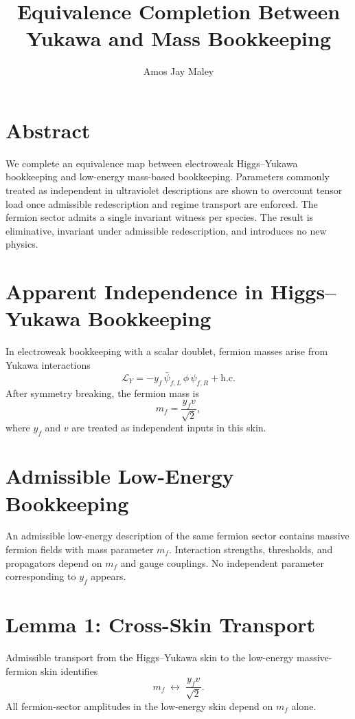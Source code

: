 ﻿\documentclass[11pt]{article}
\title{Equivalence Completion Between Yukawa and Mass Bookkeeping}
\author{Amos Jay Maley}
\date{}
\begin{document}
\maketitle

\section*{Abstract}
We complete an equivalence map between electroweak Higgs--Yukawa bookkeeping and low-energy mass-based bookkeeping. Parameters commonly treated as independent in ultraviolet descriptions are shown to overcount tensor load once admissible redescription and regime transport are enforced. The fermion sector admits a single invariant witness per species. The result is eliminative, invariant under admissible redescription, and introduces no new physics.

\section{Apparent Independence in Higgs--Yukawa Bookkeeping}
In electroweak bookkeeping with a scalar doublet, fermion masses arise from Yukawa interactions
\begin{equation}
\mathcal{L}_Y = -y_f\,\bar{\psi}_{f,L}\,\phi\,\psi_{f,R} + \text{h.c.}
\end{equation}
After symmetry breaking, the fermion mass is
\begin{equation}
m_f = \frac{y_f v}{\sqrt{2}} ,
\end{equation}
where $y_f$ and $v$ are treated as independent inputs in this skin.

\section{Admissible Low-Energy Bookkeeping}
An admissible low-energy description of the same fermion sector contains massive fermion fields with mass parameter $m_f$. Interaction strengths, thresholds, and propagators depend on $m_f$ and gauge couplings. No independent parameter corresponding to $y_f$ appears.

\section{Lemma 1: Cross-Skin Transport}
Admissible transport from the Higgs--Yukawa skin to the low-energy massive-fermion skin identifies
\begin{equation}
m_f \;\leftrightarrow\; \frac{y_f v}{\sqrt{2}} .
\end{equation}
All fermion-sector amplitudes in the low-energy skin depend on $m_f$ alone.
\end{document}
